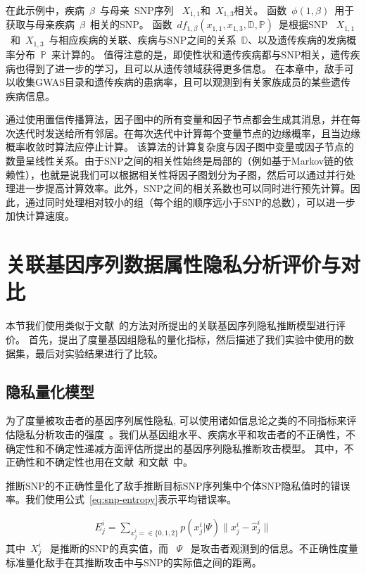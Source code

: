 在此示例中，疾病~$\beta$~与母亲~SNP序列 ~$X_{1,1}$和~$X_{1,3}$相关。 函数~$\phi(1,\beta)$~用于获取与母亲疾病~$\beta$~相关的SNP。 函数~$df_{1,\beta}(x_{1,1},x_{1,3},\mathbb{D}, \mathbb{P})$~是根据SNP ~$X_{1,1}$~和~$X_{1,3}$~与相应疾病的关联、疾病与SNP之间的关系~$\mathbb{D}$、以及遗传疾病的发病概率分布~$\mathbb{P}$~来计算的。
值得注意的是，即使性状和遗传疾病都与SNP相关，遗传疾病也得到了进一步的学习，且可以从遗传领域获得更多信息。 在本章中，敌手可以收集GWAS目录和遗传疾病的患病率，且可以观测到有关家族成员的某些遗传疾病信息。

通过使用置信传播算法，因子图中的所有变量和因子节点都会生成其消息，并在每次迭代时发送给所有邻居。在每次迭代中计算每个变量节点的边缘概率，且当边缘概率收敛时算法应停止计算。
该算法的计算复杂度与因子图中变量或因子节点的数量呈线性关系。由于SNP之间的相关性始终是局部的（例如基于Markov链的依赖性），也就是说我们可以根据相关性将因子图划分为子图，然后可以通过并行处理进一步提高计算效率。此外，SNP之间的相关系数也可以同时进行预先计算。因此，通过同时处理相对较小的组（每个组的顺序远小于SNP的总数），可以进一步加快计算速度。


\section{关联基因序列数据属性隐私分析评价与对比} 


本节我们使用类似于文献~\cite{humbert2013addressing,deznabi2018inference}的方法对所提出的关联基因序列隐私推断模型进行评价。 首先，提出了度量基因组隐私的量化指标，然后描述了我们实验中使用的数据集，最后对实验结果进行了比较。

\subsection{隐私量化模型}

为了度量被攻击者的基因序列属性隐私, 可以使用诸如信息论之类的不同指标来评估隐私分析攻击的强度~\cite{marchini2007newa,shokri2011quantifying,serjantov2002towards}。我们从基因组水平、疾病水平和攻击者的不正确性，不确定性和不确定性递减方面评估所提出的基因序列隐私推断攻击模型。 其中，不正确性和不确定性也用在文献~\cite{humbert2013addressing}和文献~\cite{deznabi2018inference}中。

推断SNP的不正确性量化了敌手推断目标SNP序列集中个体SNP隐私值时的错误率。我们使用公式~\ref{eq:snp-entropy}表示平均错误率。

\begin{equation}
\begin{aligned}\label{eq:snp-error-rate}
E^i_j=\sum_{x^i_j=\in \{0,1,2\}}{p(x^i_j|\Psi)\|x^i_j - \hat{x}^i_j\|}
\end{aligned}
\end{equation}
其中~$X^i_j$~ 是推断的SNP的真实值，而 ~$\Psi$~ 是攻击者观测到的信息。不正确性度量标准量化敌手在其推断攻击中与SNP的实际值之间的距离。


